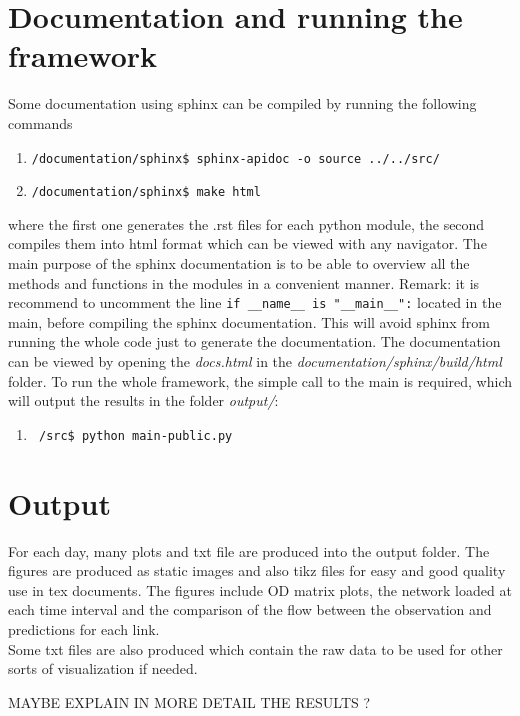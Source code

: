 \documentclass[a4paper,12pt]{article}
\begin{document}
\section{Documentation and running the framework}
Some documentation using sphinx can be compiled by running the following commands
\begin{enumerate}
\item \begin{verbatim}/documentation/sphinx$ sphinx-apidoc -o source ../../src/ \end{verbatim}
\item \begin{verbatim}/documentation/sphinx$ make html \end{verbatim}
\end{enumerate}
where the first one generates the .rst files for each python module, the second compiles them into html format which can be viewed with any navigator. The main purpose of the sphinx documentation is to be able to overview all the methods and functions in the modules in a convenient manner. Remark: it is recommend to uncomment the line \verb+if __name__ is "__main__":+ located in the main, before compiling the sphinx documentation. This will avoid sphinx from running the whole code just to generate the documentation. The documentation can be viewed by opening the \textit{docs.html} in the \textit{documentation/sphinx/build/html} folder.
To run the whole framework, the simple call to the main is required, which will output the results in the folder \textit{output/}:
\begin{enumerate}\item\begin{verbatim} /src$ python main-public.py \end{verbatim}\end{enumerate}

\section{Output}
For each day, many plots and txt file are produced into the output folder. The figures are produced as static images and also tikz files for easy and good quality use in tex documents. The figures include OD matrix plots, the network loaded at each time interval and the comparison of the flow between the observation and predictions for each link.\\
Some txt files are also produced which contain the raw data to be used for other sorts of visualization if needed.

MAYBE EXPLAIN IN MORE DETAIL THE RESULTS ?
%
%
\end{document}

